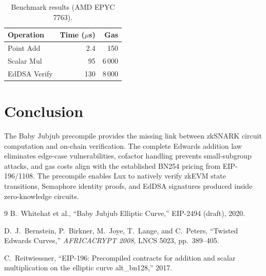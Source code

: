\documentclass[11pt,a4paper]{article}
\begin{document}
\begin{table}[H]
\centering
\caption{Benchmark results (AMD EPYC 7763).}
\begin{tabular}{lrr}
\toprule
\textbf{Operation} & \textbf{Time ($\mu$s)} & \textbf{Gas} \\
\midrule
Point Add & 2.4 & 150 \\
Scalar Mul & 95 & 6\,000 \\
EdDSA Verify & 130 & 8\,000 \\
\bottomrule
\end{tabular}
\end{table}

\section{Conclusion}

The Baby Jubjub precompile provides the missing link between zkSNARK circuit
computation and on-chain verification. The complete Edwards addition law eliminates
edge-case vulnerabilities, cofactor handling prevents small-subgroup attacks, and
gas costs align with the established BN254 pricing from EIP-196/1108. The precompile
enables Lux to natively verify zkEVM state transitions, Semaphore identity proofs,
and EdDSA signatures produced inside zero-knowledge circuits.

\begin{thebibliography}{9}
  B.~Whitehat et al., ``Baby Jubjub Elliptic Curve,'' EIP-2494 (draft), 2020.

  D.~J.~Bernstein, P.~Birkner, M.~Joye, T.~Lange, and C.~Peters,
  ``Twisted Edwards Curves,'' \textit{AFRICACRYPT 2008}, LNCS 5023, pp.~389--405.

  C.~Reitwiessner, ``EIP-196: Precompiled contracts for addition and scalar
  multiplication on the elliptic curve alt\_bn128,'' 2017.
\end{thebibliography}
\end{document}
